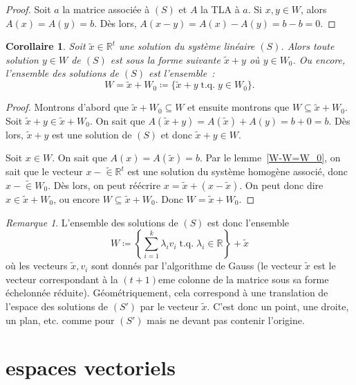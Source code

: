 \documentclass{article}
\DeclareMathOperator{\tq}{\text{ t.q. }}
\newcommand{\R}{\mathbb R}
\newtheorem{cor}[thm]{Corollaire}
\theoremstyle{definition}
\theoremstyle{remark}
\newtheorem*{rmq}{Remarque}
\begin{document}
		\begin{proof} Soit $a$ la matrice associée à $(S)$ et $A$ la TLA à $a$. Si $x, y \in W$, alors $A(x) = A(y) = b$. Dès lors, $A(x-y) = A(x) - A(y) = b-b = 0$.
		\end{proof}

		\begin{cor} Soit $\widetilde x \in \R^t$ une solution du système linéaire $(S)$. Alors toute solution $y \in W$ de $(S)$ est sous la forme suivante
		$\widetilde x + y$ où $y \in W_0$. Ou encore, l'ensemble des solutions de $(S)$ est l'ensemble~:
		\[W = \widetilde x + W_0 \coloneqq \{\widetilde x + y \tq y \in W_0\}.\] \end{cor}

		\begin{proof} Montrons d'abord que $\widetilde x + W_0 \subseteq W$ et ensuite montrons que $W \subseteq \widetilde x + W_0$. Soit
		$\widetilde x + y \in \widetilde x + W_0$. On sait que $A(\widetilde x + y) = A(\widetilde x) + A(y) = b + 0 = b$. Dès lors, $\widetilde x + y$ est une
		solution de $(S)$ et donc $\widetilde x + y \in W$.

		Soit $x \in W$. On sait que $A(x) = A(\widetilde x) = b$. Par le lemme~\ref{W-W=W_0}, on sait que le vecteur $x-\widetilde \in \R^t$ est une solution du système
		homogène associé, donc $x-\widetilde \in W_0$. Dès lors, on peut réécrire $x = \widetilde x + (x-\widetilde x)$. On peut donc dire $x \in \widetilde x + W_0$, ou
		encore $W \subseteq \widetilde x + W_0$. Donc $W = \widetilde x + W_0$. \end{proof}

		\begin{rmq} L'ensemble des solutions de $(S)$ est donc l'ensemble \[W \coloneqq \left\{\sum_{i=1}^k\lambda_iv_i \tq \lambda_i \in \R\right\} + \widetilde x\] où
		les vecteurs $\widetilde x, v_i$ sont donnés par l'algorithme de Gauss (le vecteur $\widetilde x$ est le vecteur correspondant à la $(t+1)$eme colonne de
		la matrice sous sa forme échelonnée réduite). Géométriquement, cela correspond à une translation de l'espace des solutions de $(S')$ par le vecteur
		$\widetilde x$. C'est donc un point, une droite, un plan, etc. comme pour $(S')$ mais ne devant pas contenir l'origine. \end{rmq}

\newpage
\section{espaces vectoriels}
\end{document}
